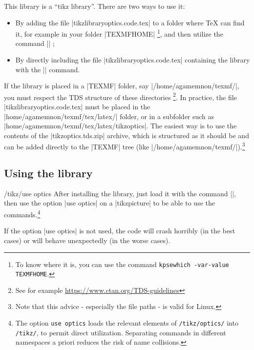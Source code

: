 \documentclass[a4paper]{ltxdoc}
\begin{document}
This library is a \enquote{tikz library}. There are two ways to use it:
\begin{itemize}
  \item By adding the file |tikzlibraryoptics.code.tex| to a folder where \TeX{} can find it, for example in your folder |TEXMFHOME| \footnote{To know where it is, you can use the command \verb|kpsewhich -var-value TEXMFHOME|.}, and then utilize the command |\usetikzlibrary{optics}| ;
  \item By directly including the file |tikzlibraryoptics.code.tex| containing the library with the || command.
\end{itemize}

If the library is placed in a |TEXMF| folder, say |/home/agamemnon/texmf/|, you must respect the TDS structure of these directories \footnote{See for example \url{https://www.ctan.org/TDS-guidelines}}. In practice, the file |tikzlibraryoptics.code.tex| must be placed in the |home/agamemnon/texmf/tex/latex/| folder, or in a subfolder such as |home/agamemnon/texmf/tex/latex/tikzoptics|. The easiest way is to use the contents of the |tikzoptics.tds.zip| archive, which is structured as it should be and can be added directly to the |TEXMF| tree (like |/home/agamemnon/texmf/|).\footnote{Note that this advice - especially the file paths - is valid for Linux.}

\subsection{Using the library}

\begin{key}{/tikz/use optics}
After installing the library, just load it with the command |\usetikzlibrary{optics}|, then use the option |use optics| on a |tikzpicture| to be able to use the commands.\footnote{The option \texttt{use optics} loads the relevant elements of \texttt{/tikz/optics/} into \texttt{/tikz/}, to permit direct utilization. Separating commands in different namespaces a priori reduces the risk of name collisions.}

\begin{codeexample}[width=5cm]
\end{codeexample}

If the option |use optics| is not used, the code will crash horribly (in the best cases) or will behave unexpectedly (in the worse cases).
\end{key}
\end{document}
